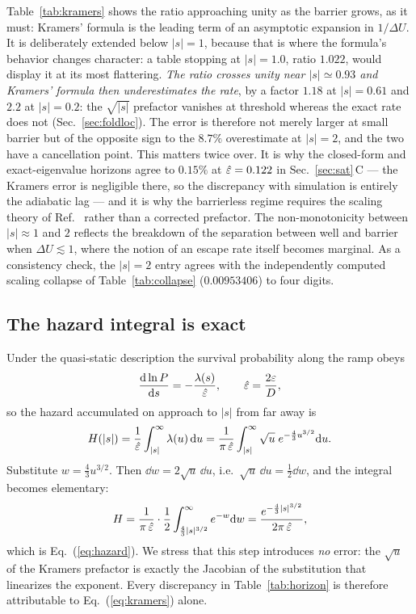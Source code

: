 Table~\ref{tab:kramers} shows the ratio approaching unity as the barrier grows, as it must: Kramers' formula is the leading term of an asymptotic expansion in $1/\Delta U$.  It is deliberately extended below $|s|=1$, because that is where the formula's behavior changes character: a table stopping at $|s|=1.0$, ratio $1.022$, would display it at its most flattering.  \emph{The ratio crosses unity near $|s|\simeq0.93$ and Kramers' formula then \emph{under}estimates the rate}, by a factor $1.18$ at $|s|=0.61$ and $2.2$ at $|s|=0.2$: the $\sqrt{|s|}$ prefactor vanishes at threshold whereas the exact rate does not (Sec.~\ref{sec:foldloc}).  The error is therefore not merely larger at small barrier but of the opposite sign to the $8.7\%$ overestimate at $|s|=2$, and the two have a cancellation point.  This matters twice over.  It is why the closed-form and exact-eigenvalue horizons agree to $0.15\%$ at $\hat\varepsilon=0.122$ in Sec.~\ref{sec:sat}\,C --- the Kramers error is negligible there, so the discrepancy with simulation is entirely the adiabatic lag --- and it is why the barrierless regime requires the scaling theory of Ref.~\cite{HathcockSethna2021} rather than a corrected prefactor.  The non-monotonicity between $|s|\approx1$ and $2$ reflects the breakdown of the separation between well and barrier when $\Delta U\lesssim1$, where the notion of an escape rate itself becomes marginal.  As a consistency check, the $|s|=2$ entry agrees with the independently computed scaling collapse of Table~\ref{tab:collapse} ($0.00953406$) to four digits.

\subsection{The hazard integral is exact}

Under the quasi-static description the survival probability along the ramp obeys
\begin{equation}
\frac{\mathrm{d}\ln P}{\mathrm{d} s}=-\frac{\lambda(s)}{\hat\varepsilon},
\qquad \hat\varepsilon=\frac{2\varepsilon}{D},
\end{equation}
so the hazard accumulated on approach to $|s|$ from far away is
\begin{equation}
H(|s|)=\frac{1}{\hat\varepsilon}\int_{|s|}^{\infty}\lambda(u)\,\mathrm{d} u
=\frac{1}{\pi\,\hat\varepsilon}\int_{|s|}^{\infty}\sqrt u\;e^{-\frac43u^{3/2}}\mathrm{d} u .
\end{equation}
Substitute $w=\tfrac43u^{3/2}$.  Then $\dd w=2\sqrt u\,\dd u$, i.e.\ $\sqrt u\,\dd u=\tfrac12\dd w$, and the integral becomes elementary:
\begin{equation}
H=\frac{1}{\pi\,\hat\varepsilon}\cdot\frac12\int_{\frac43|s|^{3/2}}^{\infty}e^{-w}\mathrm{d} w
=\frac{e^{-\frac43|s|^{3/2}}}{2\pi\,\hat\varepsilon},
\end{equation}
which is Eq.~(\ref{eq:hazard}).  We stress that this step introduces \emph{no} error: the $\sqrt u$ of the Kramers prefactor is exactly the Jacobian of the substitution that linearizes the exponent.  Every discrepancy in Table~\ref{tab:horizon} is therefore attributable to Eq.~(\ref{eq:kramers}) alone.


